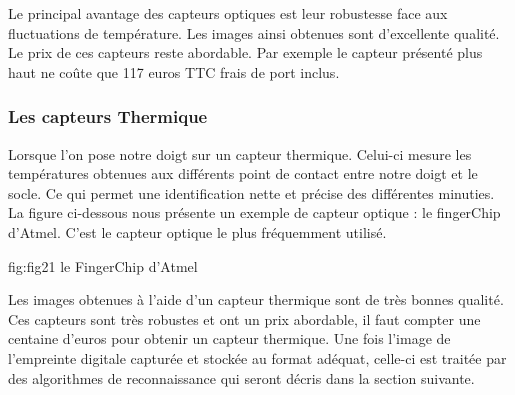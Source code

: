 \documentclass[overfullbox]{polytech/polytech}
\begin{document}
Le principal avantage des capteurs optiques est leur robustesse face aux fluctuations de température. Les images ainsi obtenues sont d'excellente qualité. Le prix de ces capteurs reste abordable. Par exemple le capteur présenté plus haut ne coûte que 117 euros TTC frais de port inclus. 

\subsubsection {Les capteurs Thermique}
Lorsque l'on pose notre doigt sur un capteur thermique. Celui-ci mesure les températures obtenues aux différents point de contact entre notre doigt et le socle. Ce qui permet une identification nette et précise des différentes minuties. La figure ci-dessous nous présente un exemple de capteur optique : le fingerChip d'Atmel. C'est le capteur optique le plus fréquemment utilisé.

\begin{Figure}{fig:fig21 }{le FingerChip d'Atmel}
\end{Figure}

Les images obtenues à l'aide d'un capteur thermique sont de très bonnes qualité. Ces capteurs sont très robustes et ont un prix abordable, il faut compter une centaine d'euros pour obtenir un capteur thermique.
\newline
Une fois l'image de l'empreinte digitale capturée et stockée au format adéquat, celle-ci est traitée par des algorithmes de reconnaissance qui seront décris dans la section suivante. 
\end{document}
